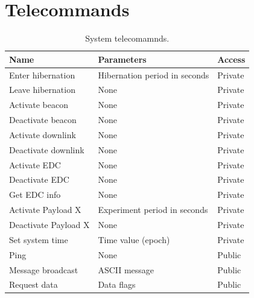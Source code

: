 \section{Telecommands}

\begin{table}[!h]
    \centering
    \begin{tabular}{lll}
        \toprule[1.5pt]
        \textbf{Name}          & \textbf{Parameters}           & \textbf{Access} \\
        \midrule
        Enter hibernation      & Hibernation period in seconds & Private         \\
        Leave hibernation      & None                          & Private         \\
        Activate beacon        & None                          & Private         \\
        Deactivate beacon      & None                          & Private         \\
        Activate downlink      & None                          & Private         \\
        Deactivate downlink    & None                          & Private         \\
        Activate EDC           & None                          & Private         \\
        Deactivate EDC         & None                          & Private         \\
        Get EDC info           & None                          & Private         \\
        Activate Payload X     & Experiment period in seconds  & Private         \\
        Deactivate Payload X   & None                          & Private         \\
        Set system time        & Time value (epoch)            & Private         \\
        Ping                   & None                          & Public          \\
        Message broadcast      & ASCII message                 & Public          \\
        Request data           & Data flags                    & Public          \\
        \bottomrule[1.5pt]
    \end{tabular}
    \caption{System telecomamnds.}
    \label{tab:system-telecommands}
\end{table}

